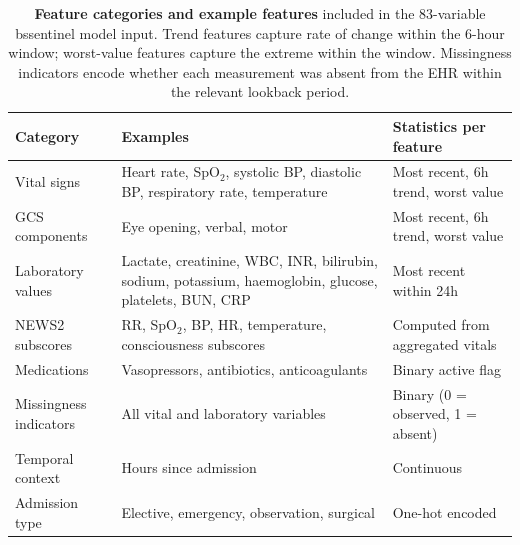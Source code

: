 \documentclass[12pt]{article}
\begin{document}
\begin{table}[H]
\centering
\caption{\textbf{Feature categories and example features} included in the
83-variable bssentinel model input. Trend features capture rate of change
within the 6-hour window; worst-value features capture the extreme within
the window. Missingness indicators encode whether each measurement was
absent from the EHR within the relevant lookback period.}
\label{tab:features}
\begin{tabular}{p{3.5cm}p{4.5cm}p{5.0cm}}
\toprule
\textbf{Category} & \textbf{Examples} & \textbf{Statistics per feature} \\
\midrule
Vital signs & Heart rate, SpO$_2$, systolic BP, diastolic BP, respiratory rate, temperature & Most recent, 6h trend, worst value \\
\addlinespace
GCS components & Eye opening, verbal, motor & Most recent, 6h trend, worst value \\
\addlinespace
Laboratory values & Lactate, creatinine, WBC, INR, bilirubin, sodium, potassium, haemoglobin, glucose, platelets, BUN, CRP & Most recent within 24h \\
\addlinespace
NEWS2 subscores & RR, SpO$_2$, BP, HR, temperature, consciousness subscores & Computed from aggregated vitals \\
\addlinespace
Medications & Vasopressors, antibiotics, anticoagulants & Binary active flag \\
\addlinespace
Missingness indicators & All vital and laboratory variables & Binary (0 = observed, 1 = absent) \\
\addlinespace
Temporal context & Hours since admission & Continuous \\
\addlinespace
Admission type & Elective, emergency, observation, surgical & One-hot encoded \\
\bottomrule
\end{tabular}
\end{table}
\end{document}
